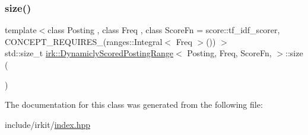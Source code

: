 \subsubsection{\texorpdfstring{size()}{size()}}
{\footnotesize\ttfamily template$<$class Posting , class Freq , class Score\+Fn  = score\+::tf\+\_\+idf\+\_\+scorer, C\+O\+N\+C\+E\+P\+T\+\_\+\+R\+E\+Q\+U\+I\+R\+E\+S\+\_\+(ranges\+::\+Integral$<$ Freq $>$()) $>$ \\
std\+::size\+\_\+t \mbox{\hyperlink{classirk_1_1DynamiclyScoredPostingRange}{irk\+::\+Dynamicly\+Scored\+Posting\+Range}}$<$ Posting, Freq, Score\+Fn, $>$\+::size (\begin{DoxyParamCaption}{ }\end{DoxyParamCaption})\hspace{0.3cm}{\ttfamily [inline]}}



The documentation for this class was generated from the following file\+:\begin{DoxyCompactItemize}
\item 
include/irkit/\mbox{\hyperlink{irkit_2index_8hpp}{index.\+hpp}}\end{DoxyCompactItemize}
